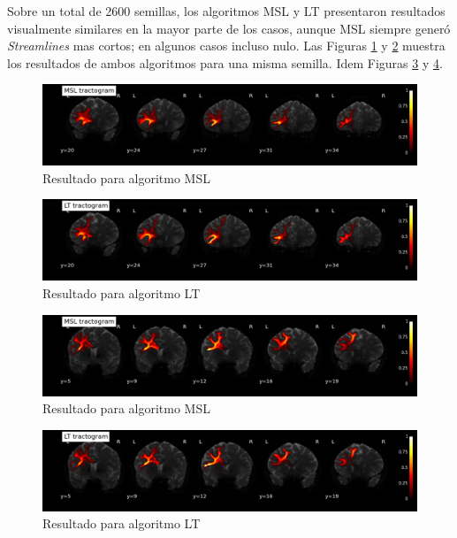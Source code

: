 Sobre un total de 2600 semillas, los algoritmos MSL y LT presentaron resultados
visualmente similares en la mayor parte de los casos, aunque MSL siempre
gener\'o \textit{Streamlines} mas cortos; en algunos casos incluso nulo. 
Las Figuras \ref{fig:msl99} y \ref{fig:lt99} muestra los resultados de ambos 
algoritmos para una misma semilla. Idem Figuras \ref{fig:msl107} y \ref{fig:lt107}.

\begin{figure}[h!]
   \centering
    \includegraphics[width=\textwidth]{img/msl_99_123_54.png}
    \caption{Resultado para algoritmo MSL}
    \label{fig:msl99}
\end{figure}

\begin{figure}[h!]
   \centering
    \includegraphics[width=\textwidth]{img/lt_99_123_54.png}
    \caption{Resultado para algoritmo LT}
    \label{fig:lt99}
\end{figure}

\begin{figure}[h!]
   \centering
    \includegraphics[width=\textwidth]{img/msl_107_111_66.png}
    \caption{Resultado para algoritmo MSL}
    \label{fig:msl107}
\end{figure}

\begin{figure}[h!]
   \centering
    \includegraphics[width=\textwidth]{img/lt_107_111_66.png}
    \caption{Resultado para algoritmo LT}
    \label{fig:lt107}
\end{figure}


